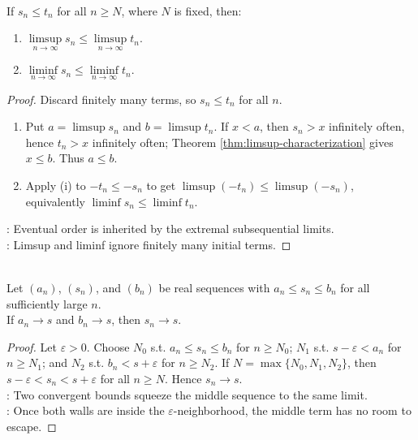 \begin{theorem} \label{thm:limsup-liminf-order-comparison} \\
If $s_n\leq t_n$ for all $n\geq N$, where $N$ is fixed, then:
\begin{enumerate}[label=(\roman*)]
\setlength{\itemsep}{0pt}
\item $\limsup\limits_{n\to\infty}s_n\leq \limsup\limits_{n\to\infty}t_n$.
\item $\liminf\limits_{n\to\infty}s_n\leq \liminf\limits_{n\to\infty}t_n$.
\end{enumerate}
\begin{proof}
Discard finitely many terms, so $s_n\leq t_n$ for all $n$.
\begin{enumerate}[label=(\roman*)]
\setlength{\itemsep}{0pt}
\item Put $a=\limsup s_n$ and $b=\limsup t_n$. If $x<a$, then $s_n>x$ infinitely often, hence $t_n>x$ infinitely often; Theorem \ref{thm:limsup-characterization} gives $x\leq b$. Thus $a\leq b$.
\item Apply (i) to $-t_n\leq -s_n$ to get $\limsup(-t_n)\leq\limsup(-s_n)$, equivalently $\liminf s_n\leq\liminf t_n$.
\end{enumerate}
: Eventual order is inherited by the extremal subsequential limits.\\
: Limsup and liminf ignore finitely many initial terms.
\end{proof}
\end{theorem}

\begin{theorem} \label{thm:pinching-theorem-sequences} \\
Let $(a_n)$, $(s_n)$, and $(b_n)$ be real sequences with $a_n\leq s_n\leq b_n$ for all sufficiently large $n$.\\
If $a_n\to s$ and $b_n\to s$, then $s_n\to s$.
\begin{proof}
Let $\varepsilon>0$. Choose $N_0$ s.t. $a_n\leq s_n\leq b_n$ for $n\geq N_0$; $N_1$ s.t. $s-\varepsilon<a_n$ for $n\geq N_1$; and $N_2$ s.t. $b_n<s+\varepsilon$ for $n\geq N_2$. If $N=\max\{N_0,N_1,N_2\}$, then $s-\varepsilon<s_n<s+\varepsilon$ for all $n\geq N$. Hence $s_n\to s$.\\
: Two convergent bounds squeeze the middle sequence to the same limit.\\
: Once both walls are inside the $\varepsilon$-neighborhood, the middle term has no room to escape.
\end{proof}
\end{theorem}

